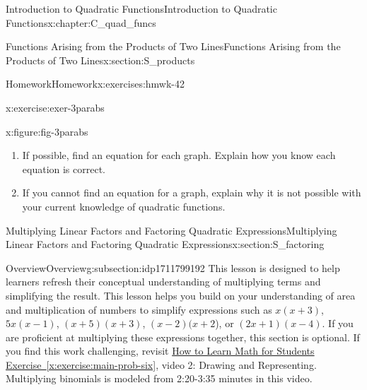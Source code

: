 \documentclass[oneside,10pt,]{book}
\newcommand{\xreffont}{\relax}
\numberwithin{equation}{chapter}
\begin{document}
\begin{chapterptx}{Introduction to Quadratic Functions}{}{Introduction to Quadratic Functions}{}{}{x:chapter:C_quad_funcs}
\begin{sectionptx}{Functions Arising from the Products of Two Lines}{}{Functions Arising from the Products of Two Lines}{}{}{x:section:S_products}
\begin{exercises-subsection}{Homework}{}{Homework}{}{}{x:exercises:hmwk-42}
\begin{divisionexercise}{8}{}{}{x:exercise:exer-3parabs}
\begin{figureptx}{}{x:figure:fig-3parabs}{}
\begin{image}{0.15}{0.7}{0.15}
\end{image}%
\tcblower
\end{figureptx}%
\begin{enumerate}[font=\bfseries,label=(\alph*),ref=\alph*]
\item{}If possible, find an equation for each graph. Explain how you know each equation is correct.%
\item{}If you cannot find an equation for a graph, explain why it is not possible with your current knowledge of quadratic functions.%
\end{enumerate}
\end{divisionexercise}%
\end{exercises-subsection}
\end{sectionptx}
%
%
\typeout{************************************************}
\typeout{************************************************}
%
\begin{sectionptx}{Multiplying Linear Factors and Factoring Quadratic Expressions}{}{Multiplying Linear Factors and Factoring Quadratic Expressions}{}{}{x:section:S_factoring}
%
%
\typeout{************************************************}
\typeout{************************************************}
%
\begin{subsectionptx}{Overview}{}{Overview}{}{}{g:subsection:idp1711799192}
This lesson is designed to help learners refresh their conceptual understanding of multiplying terms and simplifying the result. This lesson helps you build on your understanding of area and multiplication of numbers to simplify expressions such as \(x(x + 3)\), \(5x(x - 1)\), \((x + 5)(x + 3)\), \((x - 2)(x + 2\)), or \((2x + 1)(x - 4)\). If you are proficient at multiplying these expressions together, this section is optional. If you find this work challenging, revisit \hyperref[x:exercise:main-prob-six]{How to Learn Math for Students Exercise~{\xreffont\ref{x:exercise:main-prob-six}}}, video 2: Drawing and Representing. Multiplying binomials is modeled from 2:20-3:35 minutes in this video.%
\end{subsectionptx}
%
%
\typeout{************************************************}
\typeout{************************************************}
%

\end{sectionptx}
\end{chapterptx}
\end{document}
